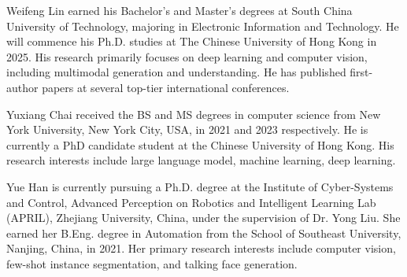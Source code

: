 \vspace{-3em}

\begin{IEEEbiography}{Weifeng Lin}
earned his Bachelor's and Master's degrees at South China University of Technology, majoring in Electronic Information and Technology. He will commence his Ph.D. studies at The Chinese University of Hong Kong in 2025. His research primarily focuses on deep learning and computer vision, including multimodal generation and understanding. He has published first-author papers at several top-tier international conferences.
\end{IEEEbiography}

\vspace{-3em}

\begin{IEEEbiography}{Yuxiang Chai}
received the BS and MS degrees in computer science from New York University, New York City, USA, in 2021 and 2023 respectively. He is currently a PhD candidate student at the Chinese University of Hong Kong. His research interests include large language model, machine learning, deep learning.
\end{IEEEbiography}

\vspace{-3em}

\begin{IEEEbiography}{Yue Han}
is currently pursuing a Ph.D. degree at the Institute of Cyber-Systems and Control, Advanced Perception on Robotics and Intelligent Learning Lab (APRIL), Zhejiang University, China, under the supervision of Dr. Yong Liu. She earned her B.Eng. degree in Automation from the School of Southeast University, Nanjing, China, in 2021. Her primary research interests include computer vision, few-shot instance segmentation, and talking face generation.
\end{IEEEbiography}

